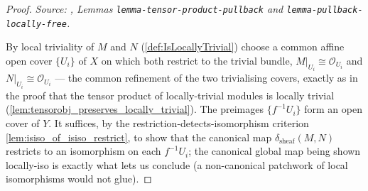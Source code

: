 \begin{proof}
  \textit{Source: \cite{stacks-project}, Lemmas \texttt{lemma-tensor-product-pullback} and
  \texttt{lemma-pullback-locally-free}.}

  By local triviality of \(M\) and \(N\) (\cref{def:IsLocallyTrivial}) choose a common
  affine open cover \(\{U_i\}\) of \(X\) on which both restrict to the trivial bundle,
  \(M|_{U_i} \cong \mathcal{O}_{U_i}\) and \(N|_{U_i} \cong \mathcal{O}_{U_i}\) --- the
  common refinement of the two trivialising covers, exactly as in the proof that the
  tensor product of locally-trivial modules is locally trivial
  (\cref{lem:tensorobj_preserves_locally_trivial}). The preimages
  \(\{f^{-1}U_i\}\) form an open cover of \(Y\). It suffices, by the
  restriction-detects-isomorphism criterion \cref{lem:isiso_of_isiso_restrict}, to show
  that the canonical map \(\delta_{\mathrm{sheaf}}(M,N)\) restricts to an isomorphism on
  each \(f^{-1}U_i\); the canonical global map being shown locally-iso is exactly what
  lets us conclude (a non-canonical patchwork of local isomorphisms would not glue).


\end{proof}
